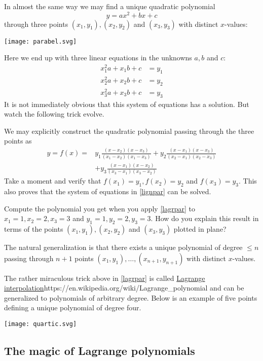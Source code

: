\documentclass{article}
\begin{document}
In almost the same way we may find a unique quadratic polynomial
$$
y = a x^2 + b x + c
$$
through three points $(x_1, y_1), (x_2, y_2)$ and $(x_3, y_3)$ with distinct $x$-values:

\texttt{[image: parabel.svg]}


Here we end up with three linear equations in the unknowns $a, b$ and $c$:
\begin{align}\label{lignpar}
x_1^2 a + x_1 b + c &= y_1\\
x_2^2 a + x_2 b + c &= y_2\\
x_3^2 a + x_3 b + c &= y_3
\end{align}
It is not immediately obvious that this system of equations has a solution. But watch the following trick evolve.

We may explicitly construct the quadratic polynomial passing through the three points as
\begin{align}\label{lagrpar}
  y = f(x) = &y_1 \frac{(x - x_2)(x-x_3)}{(x_1 - x_2)(x_1-x_3)} + y_2 \frac{(x - x_1)(x - x_3)}{(x_2 - x_1)(x_2-x_3)}\\
  &+ y_3 \frac{(x - x_1)(x - x_2)}{(x_3 - x_1)(x_3-x_2)}
\end{align}
Take a moment and verify that $f(x_1) = y_1, f(x_2) = y_2$ and $f(x_3)= y_3$. This also proves that
the system of equations in \eqref{lignpar} can be solved.

\beginshex\label{lagrcol}
Compute the polynomial you get when you apply \eqref{lagrpar} to $x_1 = 1, x_2 = 2, x_3= 3$ and
$y_1 = 1, y_2 = 2, y_3 = 3$. How do you explain this result in terms of the
points $(x_1, y_1), (x_2, y_2)$ and $(x_3, y_3)$ plotted in plane?
\endshex


The natural generalization is that there exists a unique polynomial of degree $\leq n$ passing through $n+1$ points
$(x_1, y_1), \dots, (x_{n+1}, y_{n+1})$ with distinct $x$-values.

The rather miraculous trick above in \eqref{lagrpar} is called \url{Lagrange interpolation}{https://en.wikipedia.org/wiki/Lagrange_polynomial} and can be generalized to polynomials of arbitrary degree.
Below is an example of five points defining a unique polynomial of degree four.

\texttt{[image: quartic.svg]}

\subsection{The magic of Lagrange polynomials}
\end{document}
